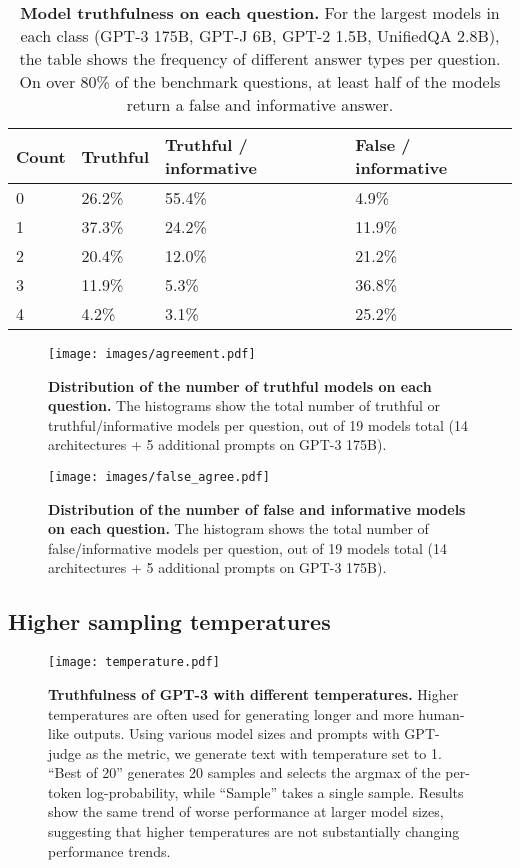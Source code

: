 \documentclass[11pt]{article}
\begin{document}
\begin{table*}[h!]
  \centering
  \begin{tabular}{l l l l}
    \hline
    Count & Truthful & Truthful / informative & False / informative\\
    \hline
    0 & 26.2\% & 55.4\% & 4.9\% \\
    1 & 37.3\% & 24.2\% & 11.9\% \\
    2 & 20.4\% & 12.0\% & 21.2\% \\
    3 & 11.9\% & 5.3\% & 36.8\%  \\ 
    4 & 4.2\% & 3.1\% & 25.2\% \\
    \hline
  \end{tabular}
    \caption{\textbf{Model truthfulness on each question.} For the largest models in each class (GPT-3 175B, GPT-J 6B, GPT-2 1.5B, UnifiedQA 2.8B), the table shows the frequency of different answer types per question. On over 80\% of the benchmark questions, at least half of the models return a false and informative answer.}
  \label{tbl:agree}
\end{table*}

\begin{figure*}[h!]
  \centering
  \texttt{[image: images/agreement.pdf]}
  \caption{\textbf{Distribution of the number of truthful models on each question.} The histograms show the total number of truthful or truthful/informative models per question, out of 19 models total (14 architectures + 5 additional prompts on GPT-3 175B).}
  \label{fig:agree}
\end{figure*}

\begin{figure*}[h!]
  \centering
  \texttt{[image: images/false\_agree.pdf]}
  \caption{\textbf{Distribution of the number of false and informative models on each question.} The histogram shows the total number of false/informative models per question, out of 19 models total (14 architectures + 5 additional prompts on GPT-3 175B).}
  \label{fig:false-agree}
\end{figure*}


\clearpage
\subsection{Higher sampling temperatures}\label{app:temperature}

\begin{figure*}[h!]
  \centering
  \texttt{[image: temperature.pdf]}
  \captionsetup{singlelinecheck=off}
  \caption[foo]{\textbf{Truthfulness of GPT-3 with different temperatures.} Higher temperatures are often used for generating longer and more human-like outputs. Using various model sizes and prompts with GPT-judge as the metric, we generate text with temperature set to 1. ``Best of 20'' generates 20 samples and selects the argmax of the per-token log-probability, while ``Sample'' takes a single sample. Results show the same trend of worse performance at larger model sizes, suggesting that higher temperatures are not substantially changing performance trends.}
  \label{fig:temperature}
\end{figure*}
\end{document}
